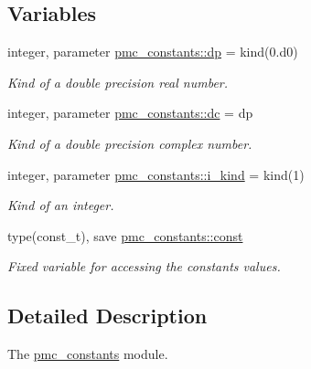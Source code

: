 \subsection*{Variables}
\begin{DoxyCompactItemize}
\item 
integer, parameter \mbox{\hyperlink{namespacepmc__constants_a396b7709ed4da67dac74cb46a1466ed6}{pmc\+\_\+constants\+::dp}} = kind(0.d0)
\begin{DoxyCompactList}\small\item\em Kind of a double precision real number. \end{DoxyCompactList}\item 
integer, parameter \mbox{\hyperlink{namespacepmc__constants_a0588e47a1de113908772c0566ff3496f}{pmc\+\_\+constants\+::dc}} = dp
\begin{DoxyCompactList}\small\item\em Kind of a double precision complex number. \end{DoxyCompactList}\item 
integer, parameter \mbox{\hyperlink{namespacepmc__constants_ad57f27d7f8ba14bb7c713f6603c3a532}{pmc\+\_\+constants\+::i\+\_\+kind}} = kind(1)
\begin{DoxyCompactList}\small\item\em Kind of an integer. \end{DoxyCompactList}\item 
type(const\+\_\+t), save \mbox{\hyperlink{namespacepmc__constants_a9235496969530bdb34cac4c63c1a56ed}{pmc\+\_\+constants\+::const}}
\begin{DoxyCompactList}\small\item\em Fixed variable for accessing the constant\textquotesingle{}s values. \end{DoxyCompactList}\end{DoxyCompactItemize}


\subsection{Detailed Description}
The \mbox{\hyperlink{namespacepmc__constants}{pmc\+\_\+constants}} module. 

